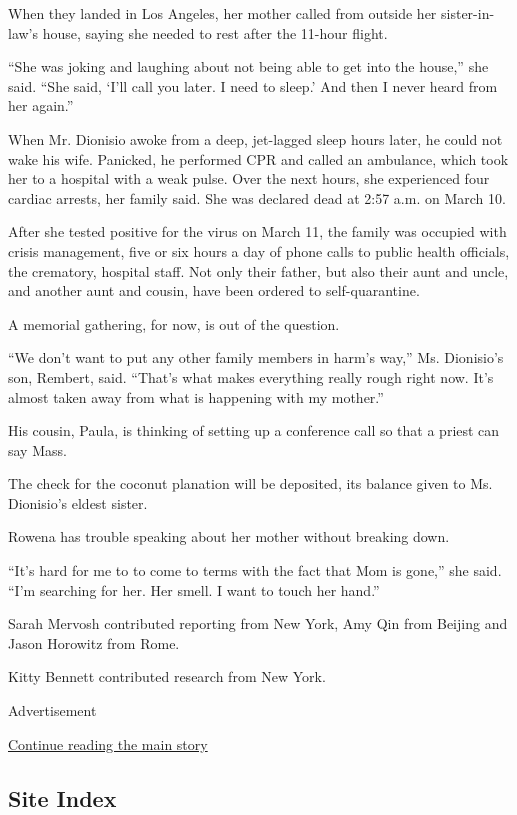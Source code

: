When they landed in Los Angeles, her mother called from outside her
sister-in-law's house, saying she needed to rest after the 11-hour
flight.

``She was joking and laughing about not being able to get into the
house,'' she said. ``She said, `I'll call you later. I need to sleep.'
And then I never heard from her again.''

When Mr. Dionisio awoke from a deep, jet-lagged sleep hours later, he
could not wake his wife. Panicked, he performed CPR and called an
ambulance, which took her to a hospital with a weak pulse. Over the next
hours, she experienced four cardiac arrests, her family said. She was
declared dead at 2:57 a.m. on March 10.

After she tested positive for the virus on March 11, the family was
occupied with crisis management, five or six hours a day of phone calls
to public health officials, the crematory, hospital staff. Not only
their father, but also their aunt and uncle, and another aunt and
cousin, have been ordered to self-quarantine.

A memorial gathering, for now, is out of the question.

``We don't want to put any other family members in harm's way,'' Ms.
Dionisio's son, Rembert, said. ``That's what makes everything really
rough right now. It's almost taken away from what is happening with my
mother.''

His cousin, Paula, is thinking of setting up a conference call so that a
priest can say Mass.

The check for the coconut planation will be deposited, its balance given
to Ms. Dionisio's eldest sister.

Rowena has trouble speaking about her mother without breaking down.

``It's hard for me to to come to terms with the fact that Mom is gone,''
she said. ``I'm searching for her. Her smell. I want to touch her
hand.''

Sarah Mervosh contributed reporting from New York, Amy Qin from Beijing
and Jason Horowitz from Rome.

Kitty Bennett contributed research from New York.

Advertisement

\protect\hyperlink{after-bottom}{Continue reading the main story}

\hypertarget{site-index}{%
\subsection{Site Index}\label{site-index}}

